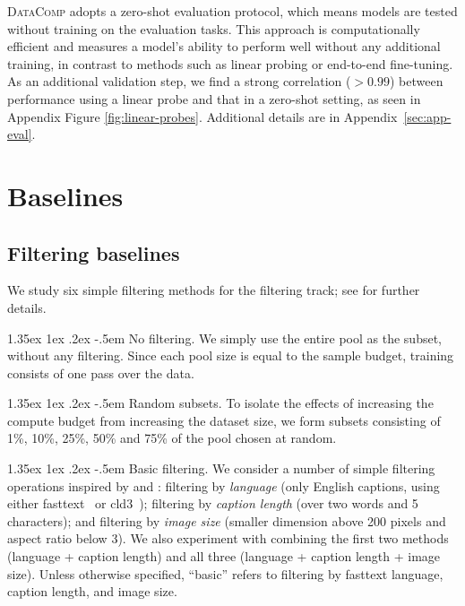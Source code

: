 \documentclass[dvipsnames,11pt]{article}
\makeatletter
\renewcommand\paragraph{\@startsection{paragraph}{4}{\z@}                                     {1.35ex \@plus1ex \@minus.2ex}                                {-.5em}
{\normalfont\normalsize\bfseries}}
\newcommand{\datanet}{\textsc{DataComp}\xspace}
\makeatother
\begin{document}
\datanet adopts a zero-shot evaluation protocol, which means models are tested without training on the evaluation tasks. This approach is computationally efficient and measures a model's ability to perform well without any additional training, in contrast to methods such as linear probing or end-to-end fine-tuning. As an additional validation step, we find a strong correlation (${>}0.99$) between performance using a linear probe and that in a zero-shot setting, as seen in Appendix Figure \ref{fig:linear-probes}.
Additional details are in Appendix~\ref{sec:app-eval}.

\section{Baselines}
\label{sec:baselines}


\subsection{Filtering baselines}

We study six simple filtering methods for the filtering track; see  for further details.

\paragraph{No filtering.} We simply use the entire pool as the subset, without any filtering. Since each pool size is equal to the sample budget, training consists of one pass over the data.

\paragraph{Random subsets.} To isolate the effects of increasing the compute budget from increasing the dataset size, we form subsets consisting of 1\%, 10\%, 25\%, 50\% and 75\% of the pool chosen at random. 

\paragraph{Basic filtering.} We consider a number of simple filtering operations inspired by \citet{laion400m} and \citet{coyo700m}: filtering by \emph{language} (only English captions, using either fasttext~\citep{joulin2017bag} or cld3~\cite{cld3});  filtering by \emph{caption length} (over two words and 5 characters); and filtering by \emph{image size} (smaller dimension above 200 pixels and aspect ratio below 3). We also experiment with combining the first two methods (language + caption length) and all three (language + caption length + image size). Unless otherwise specified, ``basic'' refers to filtering by fasttext language, caption length, and image size.
\end{document}
